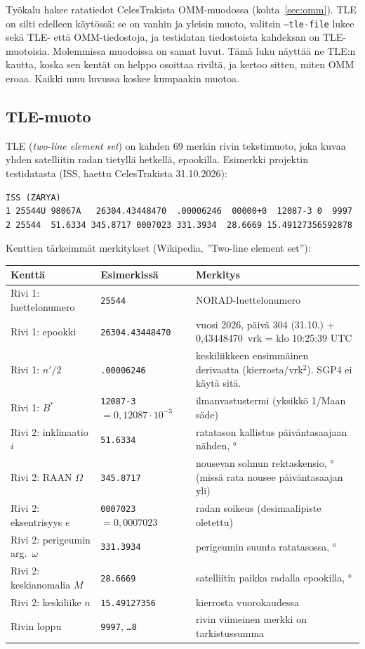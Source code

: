 \documentclass[a4paper,11pt]{article}
\newcommand{\koodi}[1]{\texttt{#1}}
\begin{document}
Työkalu hakee ratatiedot CelesTrakista OMM-muodossa (kohta~\ref{sec:omm}). TLE on silti
edelleen käytössä: se on vanhin ja yleisin muoto, valitsin \koodi{--tle-file} lukee sekä
TLE- että OMM-tiedostoja, ja testidatan tiedostoista kahdeksan on TLE-muotoisia. Molemmissa
muodoissa on samat luvut. Tämä luku näyttää ne TLE:n kautta, koska sen kentät on helppo
osoittaa riviltä, ja kertoo sitten, miten OMM eroaa. Kaikki muu luvussa koskee kumpaakin
muotoa.

\subsection{TLE-muoto}

TLE (\emph{two-line element set}) on kahden 69 merkin rivin tekstimuoto, joka kuvaa yhden satelliitin radan tietyllä hetkellä, epookilla. Esimerkki projektin testidatasta (ISS, haettu CelesTrakista 31.10.2026):

\begin{verbatim}
ISS (ZARYA)
1 25544U 98067A   26304.43448470  .00006246  00000+0  12087-3 0  9997
2 25544  51.6334 345.8717 0007023 331.3934  28.6669 15.49127356592878
\end{verbatim}

Kenttien tärkeimmät merkitykset (Wikipedia, ”Two-line element set”):

\begin{center}
\small
\begin{tabularx}{\textwidth}{@{}l l L@{}}
\toprule
Kenttä & Esimerkissä & Merkitys \\
\midrule
Rivi 1: luettelonumero & \koodi{25544} & NORAD-luettelonumero \\
Rivi 1: epookki & \koodi{26304.43448470} & vuosi 2026, päivä 304 (31.10.) + 0,43448470~vrk = klo 10:25:39 UTC \\
Rivi 1: $n'/2$ & \koodi{.00006246} & keskiliikkeen ensimmäinen derivaatta (kierrosta/vrk$^2$). SGP4 ei käytä sitä. \\
Rivi 1: $B^*$ & \koodi{12087-3} $= 0{,}12087\cdot10^{-3}$ & ilmanvastustermi (yksikkö 1/Maan säde) \\
Rivi 2: inklinaatio $i$ & \koodi{51.6334} & ratatason kallistus päiväntasaajaan nähden, ° \\
Rivi 2: RAAN $\Omega$ & \koodi{345.8717} & nousevan solmun rektaskensio, ° (missä rata nousee päiväntasaajan yli) \\
Rivi 2: eksentrisyys $e$ & \koodi{0007023} $= 0{,}0007023$ & radan soikeus (desimaalipiste oletettu) \\
Rivi 2: perigeumin arg.\ $\omega$ & \koodi{331.3934} & perigeumin suunta ratatasossa, ° \\
Rivi 2: keskianomalia $M$ & \koodi{28.6669} & satelliitin paikka radalla epookilla, ° \\
Rivi 2: keskiliike $n$ & \koodi{15.49127356} & kierrosta vuorokaudessa \\
Rivin loppu & \koodi{9997}, \koodi{\dots8} & rivin viimeinen merkki on tarkistussumma \\
\bottomrule
\end{tabularx}
\end{center}
\end{document}

